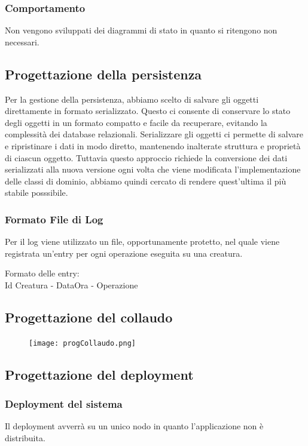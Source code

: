 \documentclass[a4paper, 11pt]{article}
\begin{document}
\subsubsection{Comportamento}
Non vengono sviluppati dei diagrammi di stato in quanto si ritengono non necessari.
\subsection{Progettazione della persistenza}
Per la gestione della persistenza, abbiamo scelto di salvare gli oggetti direttamente in formato serializzato. Questo ci consente di conservare lo stato degli oggetti in un formato compatto e facile da recuperare, evitando la complessità dei database relazionali. Serializzare gli oggetti ci permette di salvare e ripristinare i dati in modo diretto, mantenendo inalterate struttura e proprietà di ciascun oggetto.
Tuttavia questo approccio richiede la conversione dei dati serializzati alla nuova versione ogni volta che viene modificata l'implementazione delle classi di dominio, abbiamo quindi cercato di rendere quest'ultima il più stabile posssibile.

\subsubsection*{Formato File di Log}
Per il log viene utilizzato un file, opportunamente protetto, nel quale viene registrata un'entry per ogni operazione eseguita su una creatura. 

Formato delle entry:\\
Id Creatura - DataOra - Operazione

\newpage
\subsection{Progettazione del collaudo}
\begin{figure}[h!]
    \centering
    \texttt{[image: progCollaudo.png]}
    \label{fig:progCollaudo}
\end{figure}

\newpage

\newpage
\subsection{Progettazione del deployment}
\subsubsection*{Deployment del sistema}
Il deployment avverrà su un unico nodo in quanto l'applicazione non è distribuita.
\end{document}
